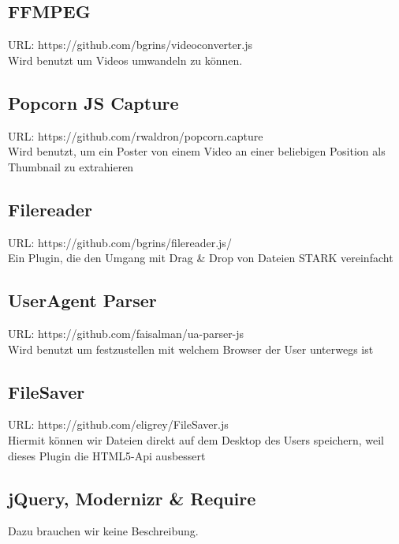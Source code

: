 \documentclass[a4paper,10pt]{scrartcl}
\begin{document}
\subsection{FFMPEG}
URL: https://github.com/bgrins/videoconverter.js\\
Wird benutzt um Videos umwandeln zu können.
\subsection{Popcorn JS Capture}
URL: https://github.com/rwaldron/popcorn.capture\\
Wird benutzt, um ein Poster von einem Video an einer beliebigen Position als Thumbnail zu extrahieren
\subsection{Filereader}
URL: https://github.com/bgrins/filereader.js/\\
Ein Plugin, die den Umgang mit Drag \& Drop von Dateien STARK vereinfacht
\subsection{UserAgent Parser}
URL: https://github.com/faisalman/ua-parser-js\\
Wird benutzt um festzustellen mit welchem Browser der User unterwegs ist
\subsection{FileSaver}
URL: https://github.com/eligrey/FileSaver.js\\
Hiermit können wir Dateien direkt auf dem Desktop des Users speichern, weil dieses Plugin die HTML5-Api ausbessert
\subsection{jQuery, Modernizr \& Require}
Dazu brauchen wir keine Beschreibung.
\end{document}
